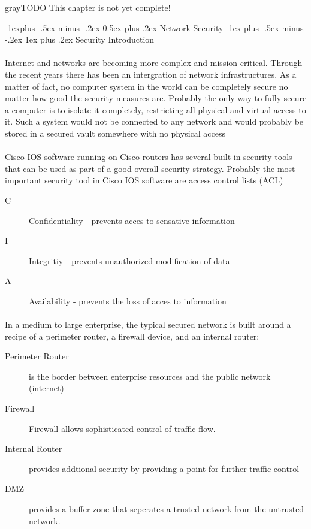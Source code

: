 \documentclass[10pt,landscape]{article}
\makeatletter
\renewcommand{\subsection}{\@startsection{subsection}{2}{0mm}%
                                {-1explus -.5ex minus -.2ex}%
                                {0.5ex plus .2ex}%
                                {\normalfont\normalsize\bfseries}}
\renewcommand{\subsubsection}{\@startsection{subsubsection}{3}{0mm}%
                                {-1ex plus -.5ex minus -.2ex}%
                                {1ex plus .2ex}%
                                {\normalfont\small\bfseries}}
\makeatother
\begin{document}
\begin{multicols}{3}
\begin{textbox}{gray}{TODO}
	This chapter is not yet complete!
\end{textbox}

\subsection{Network Security}
\subsubsection{Security Introduction}
\paragraph{}
Internet and networks are becoming more complex and mission critical. Through the recent years there has been an intergration of network infrastructures.
As a matter of fact, no computer system in the world can be completely secure no matter how good the security measures are. Probably the only way to fully secure a computer is to isolate it completely, restricting all physical and virtual access to it. Such a system would not be connected to any network and would probably be stored in a secured vault somewhere with no physical access
\paragraph{}
Cisco IOS software running on Cisco routers has several built-in security tools that can be used as part of a good overall security strategy. Probably the most important security tool in Cisco IOS software are access control lists (ACL)
\begin{description}
	\item[C] Confidentiality - prevents acces to sensative information
	\item[I] Integritiy - prevents unauthorized modification of data
	\item[A] Availability  - prevents the loss of acces to information
\end{description}
\paragraph{}
In a medium to large enterprise, the typical secured network is built around a recipe of a perimeter router, a firewall device, and an internal router:
\begin{description}
	\item[Perimeter Router] is the border between enterprise resources and the public network (internet)
	\item[Firewall] Firewall allows sophisticated control of traffic flow.
	\item[Internal Router]  provides addtional security by providing a point for further traffic control
	\item[DMZ] provides a buffer zone that seperates a trusted network from the untrusted network.
\end{description}

\end{multicols}
\end{document}
